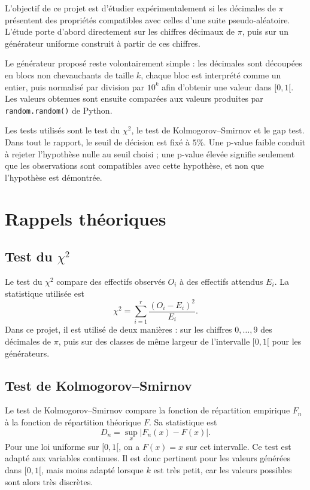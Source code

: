 \documentclass[11pt,a4paper]{report}
\begin{document}
L'objectif de ce projet est d'étudier expérimentalement si les décimales de $\pi$ présentent des propriétés compatibles avec celles d'une suite pseudo-aléatoire. L'étude porte d'abord directement sur les chiffres décimaux de $\pi$, puis sur un générateur uniforme construit à partir de ces chiffres.

Le générateur proposé reste volontairement simple : les décimales sont découpées en blocs non chevauchants de taille $k$, chaque bloc est interprété comme un entier, puis normalisé par division par $10^k$ afin d'obtenir une valeur dans $[0,1[$. Les valeurs obtenues sont ensuite comparées aux valeurs produites par \texttt{random.random()} de Python.

Les tests utilisés sont le test du $\chi^2$, le test de Kolmogorov--Smirnov et le gap test. Dans tout le rapport, le seuil de décision est fixé à $5\%$. Une p-value faible conduit à rejeter l'hypothèse nulle au seuil choisi ; une p-value élevée signifie seulement que les observations sont compatibles avec cette hypothèse, et non que l'hypothèse est démontrée.

\chapter{Rappels théoriques}

\section{Test du $\chi^2$}

Le test du $\chi^2$ compare des effectifs observés $O_i$ à des effectifs attendus $E_i$. La statistique utilisée est
\[
\chi^2 = \sum_{i=1}^{r} \frac{(O_i-E_i)^2}{E_i}.
\]
Dans ce projet, il est utilisé de deux manières : sur les chiffres $0,\ldots,9$ des décimales de $\pi$, puis sur des classes de même largeur de l'intervalle $[0,1[$ pour les générateurs.

\section{Test de Kolmogorov--Smirnov}

Le test de Kolmogorov--Smirnov compare la fonction de répartition empirique $F_n$ à la fonction de répartition théorique $F$. Sa statistique est
\[
D_n = \sup_x |F_n(x)-F(x)|.
\]
Pour une loi uniforme sur $[0,1[$, on a $F(x)=x$ sur cet intervalle. Ce test est adapté aux variables continues. Il est donc pertinent pour les valeurs générées dans $[0,1[$, mais moins adapté lorsque $k$ est très petit, car les valeurs possibles sont alors très discrètes.
\end{document}
